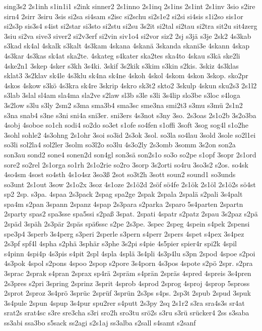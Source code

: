 {sing3s2
2s1inh
s1in1i1
s2ink
sinner2
2s1inno
2s1inq
2s1ins
2s1int
2s1inv
3sio
s2ire
sirn4
2sirr
3siru
3sis
si2sa
si4sam
s2isc
si2schu
si2s1e2
si2si
si4sis
s1i2so
sis1or
si2s3p
sis3s4
s4ist
si2star
si3sto
si2stu
si2su
3s2it
si2tal
si2tau
si2tra
sit2u
sit4zerg
3siu
si2va
sive3
siver2
si2v3erf
si2vin
siv1o4
si2vor
siz2
2sj
s3jä
s3je
2sk2
4s3kab
s3kad
sk4al
4skalk
s3kalt
4s3kam
4skana
4skanä
3skanda
skani3e
4skann
4skap
4s3kar
4s3kas
sk4at
ska2te.
4skateg
s4kater
ska2tes
ska4to
4skau
s3kä
ske2li
4ske2n1
3skep
4sker
s3kh
3s4ki.
3skif
3s2kik
s3kim
s3kin
s2kis.
3skiz
4s3klas
sklat3
3s2klav
sk4le
4s3klu
sk4na
sk4ne
4skoh
4skol
4skom
4skon
3skop.
sko2pr
4skos
4skow
s3kö
4s3kra
sk4re
3skrip
4skro
sk3t2
skto2
3skulp
4skun
sku2s3
2s1l2
s3lab
3slal
sl4am
sla4ma
sla2ve
s2law
sl3b
s3le
s3li
3s4lip
slo3be
s3loc
s4loga
3s2low
s3lu
s3ly
2sm2
s3ma
sma3b4
sma3sc
sme3na
smi2t3
s3mu
s3mü
2s1n2
s3na
snab4
s3ne
s3ni
sni4a
sni3er.
sni3ers
4s3not
s3ny
3so.
2s3oas
2s1o2b
3s2o3ba
4sobj
4soboe
so1ch
sodi4
so2do
so3et
s1ofe
so4fen
s1offi
3soft
3sog
sog4l
s1o2he
3sohl
sohle2
4s3ohng
2s1ohr
3soi
so3id
2s3ok
3sol.
so3la
so4lau
3sold
3sole
so2l1ei
so3li
sol2la4
sol2ler
3solm
so3l2o
so3lu
4s3o2ly
2s3omb
3somm
3s2on
son2a
son3au
sond2
sone4
sonen2d
son4gl
son3sä
son2s1o
so3o
so2pe
s1opf
3sopr
2s1ord
sore2
so2rel
2s1orga
so1rh
2s1o2rie
so2ro
3sorp
3s2orti
so4ru
3so3s2
s2os.
so4sk
4so4sm
4sost
so4sth
4s1o4sz
3so3ß
2sot
so3t2h
3sott
soun2
sound1
so3unds
so3unt
2s1out
3sow
2s1o2x
3soz
4s1oze
2s1ö2d
2söf
sö4fe
2s1ök
2s1öl
2s1ö2s
sö4st
sp2
2sp.
s3pa.
4spaa
2s3pack
2spag
spa2ge
2spak
2spala
2spalä
s2pali
3s4palt
spa4m
s2pan
3spann
2spanz
4spap
2s3para
s2parka
2sparo
5s4parten
2spartn
2sparty
spas2
spa3sse
spa5ssi
s2paß
3spat.
2spati
4spatr
s2patz
2spau
3s2paz
s2pä
2späd
3späh
2s3pär
2späs
spä6ssc
s2pe
2s3pe.
3spec
2speg
4spein
s4pek
2spensi
spe3p4
3sperb
3s4perg
s3peri
2sperle
s3pern
s4perr
2spers
4spet
s4pex
3s4pez
2s3pf
spf4l
4spha
s2phä
3sphär
s3phe
3s2pi
s4pie
4s5pier
spier4r
spi2k
4spil
s4pinn
4spi4p
4s3pis
s4pit
2spl
4spla
4splä
3s4pli
4s3p4lu
s3pn
2spod
4spoe
s2poi
4s3pok
4spol
s2pons
4spoo
2spop
s2pore
3s4porn
4s3pos
4spote
s2pö
2spr.
s2pra
3sprac
2sprak
s4pran
2sprax
sp4rä
2spräm
s4prän
2spräs
4spred
4spreis
3s4pren
2s3pres
s2pri
3spring
2sprinz
3sprit
4sprob
4sprod
2sprog
4sproj
4sprop
5spross
2sprot
2sproz
3s4prö
3sprüc
2sprüf
3sprün
2s3ps
s4ps.
2sp3t
2spub
2spud
3spuk
3s4pule
2spun
4spup
3s4pur
spu2rer
s4putt
2s3py
2sq
2s1r2
s3ra
sra4s3s
sr4at
srat2s
srat4sc
s3re
sre3cha
s3ri
sro2h
sro3tu
srö2s
s3ru
s3rü
srücker4
2ss
s3saba
ss3abi
ssa3bo
s5sack
ss2agi
s2s1aj
ss3alba
s2sall
s4samt
s2sanf
}
